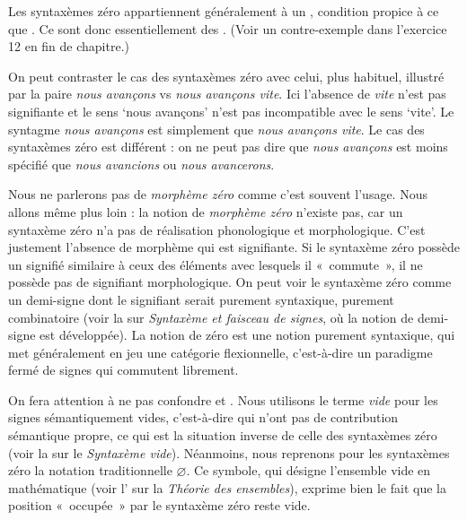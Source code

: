 \begin{sloppypar}
Les syntaxèmes zéro appartiennent généralement à un , condition propice à ce que  . Ce sont donc essentiellement des . (Voir un contre-exemple dans l'exercice 12 en fin de chapitre.)
\end{sloppypar}

On peut contraster le cas des syntaxèmes zéro avec celui, plus habituel, illustré par la paire \textit{nous avançons} vs \textit{nous avançons vite}. Ici l’absence de \textit{vite} n’est pas signifiante et le sens ‘nous avançons’ n’est pas incompatible avec le sens ‘vite’. Le syntagme \textit{nous avançons} est simplement  que \textit{nous avançons vite}. Le cas des syntaxèmes zéro est différent : on ne peut pas dire que \textit{nous avançons} est moins spécifié que \textit{nous avancions} ou \textit{nous avancerons}.

Nous ne parlerons pas de \textit{morphème zéro} comme c’est souvent l’usage. Nous allons même plus loin : la notion de \textit{morphème zéro} n’existe pas, car un syntaxème zéro n’a pas de réalisation phonologique et morphologique. C’est justement l’absence de morphème qui est signifiante. Si le syntaxème zéro possède un signifié similaire à ceux des éléments avec lesquels il «~commute~», il ne possède pas de signifiant morphologique. On peut voir le syntaxème zéro comme un demi-signe dont le signifiant serait purement syntaxique, purement combinatoire (voir la  sur \textit{Syntaxème et faisceau de signes}, où la notion de demi-signe est développée). La notion de zéro est une notion purement syntaxique, qui met généralement en jeu une catégorie flexionnelle, c’est-à-dire un paradigme fermé de signes qui commutent librement.

On fera attention à ne pas confondre  et . Nous utilisons le terme \textit{vide} pour les signes sémantiquement vides, c’est-à-dire qui n’ont pas de contribution sémantique propre, ce qui est la situation inverse de celle des syntaxèmes zéro (voir la  sur le \textit{Syntaxème vide}). Néanmoins, nous reprenons pour les syntaxèmes zéro la notation traditionnelle ${\varnothing}$. Ce symbole, qui désigne l’ensemble vide en mathématique (voir l’ sur la \textit{Théorie des ensembles}), exprime bien le fait que la position «~occupée~» par le syntaxème zéro reste vide.

